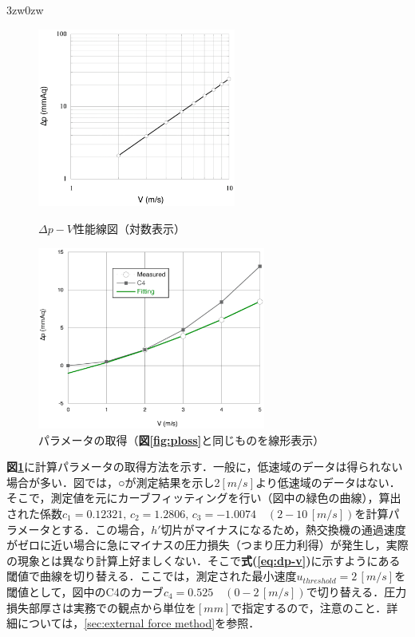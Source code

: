 \begin{indentation}{3zw}{0zw}
\begin{figure}[htdp]
  \begin{minipage}{.47\textwidth}
    \begin{center}
  	\includegraphics[width=6.5cm,clip]{ploss.eps}
  	\end{center}
  	\caption{$\Delta p-V$性能線図（対数表示）}
  	\label{fig:ploss}
  \end{minipage} \hfill
  \begin{minipage}{.47\textwidth}
    \begin{center}
    \includegraphics[width=7.5cm,clip]{rad_para.eps}
    \caption{パラメータの取得（\textbf{図\ref{fig:ploss}}と同じものを線形表示）}
    \label{fig:get_para}
    \end{center}
  \end{minipage}
\end{figure}

\textbf{図\ref{fig:get_para}}に計算パラメータの取得方法を示す．一般に，低速域のデータは得られない場合が多い．図では，○が測定結果を示し2$[m/s]$より低速域のデータはない．そこで，測定値を元にカーブフィッティングを行い（図中の緑色の曲線），算出された係数$c_{1}=0.12321,\,c_{2}=1.2806,\,c_{3}=-1.0074\quad(2-10\,[m/s])$を計算パラメータとする．この場合，$h'$切片がマイナスになるため，熱交換機の通過速度がゼロに近い場合に急にマイナスの圧力損失（つまり圧力利得）が発生し，実際の現象とは異なり計算上好ましくない．そこで\textbf{式(\ref{eq:dp-v})}に示すようにある閾値で曲線を切り替える．ここでは，測定された最小速度$u_{threshold}=2\,[m/s]$を閾値として，図中のC4のカーブ$c_{4}=0.525\quad(0-2\,[m/s])$で切り替える．圧力損失部厚さは実務での観点から単位を$[mm]$で指定するので，注意のこと．詳細については，\ref{sec:external force method}を参照．


\end{indentation}
